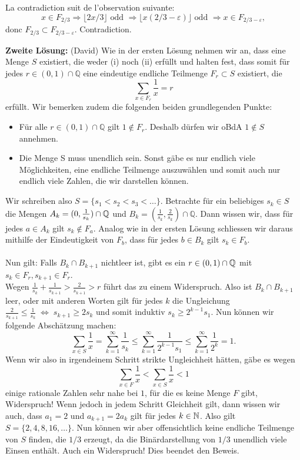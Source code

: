 La contradiction suit de l'observation suivante:
\[
x\in F_{2/3} \Rightarrow \lfloor 2x/3\rfloor \text{ odd } \Rightarrow \lfloor x(2/3-\varepsilon)\rfloor \text{ odd } \Rightarrow x\in F_{2/3-\varepsilon},
\]
donc $F_{2/3}\subset F_{2/3-\varepsilon}$. Contradiction.

\textbf{Zweite Lösung:} (David)
Wie in der ersten Lösung nehmen wir an, dass eine Menge $S$ existiert, die weder (i) noch (ii) erfüllt und halten fest, dass somit für jedes $r \in  (0,1) \cap \mathbb{Q}$ eine eindeutige endliche Teilmenge $F_r \subset S$ existiert, die 
\[\sum_{x\in F_r}\frac{1}{x}=r \]
erfüllt. Wir bemerken zudem die folgenden beiden grundlegenden Punkte:
\begin{itemize}
    \item Für alle $r \in (0,1) \cap \mathbb{Q}$ gilt $1 \notin F_r$. Deshalb dürfen wir oBdA $1 \notin S$ annehmen.
    \item Die Menge S muss unendlich sein. Sonst gäbe es nur endlich viele Möglichkeiten, eine endliche Teilmenge auszuwählen und somit auch nur endlich viele Zahlen, die wir darstellen können.
\end{itemize}
Wir schreiben also $S=\{s_1 < s_2 < s_3 < \dots \}$. Betrachte für ein beliebiges $s_k \in S$ die Mengen $A_k = (0,\frac{1}{s_k}) \cap \mathbb{Q}$ und $B_k = (\frac{1}{s_k}, \frac{2}{s_k}) \cap \mathbb{Q}$. Dann wissen wir, dass für jedes $a \in A_k$ gilt $s_k \notin F_a$. Analog wie in der ersten Lösung schliessen wir daraus mithilfe der Eindeutigkeit von $F_b$, dass für jedes $b \in B_k$ gilt $s_k \in F_b$. \\ \\ 
Nun gilt: Falls $B_k \cap B_{k+1}$ nichtleer ist, gibt es ein $r \in (0,1) \cap \mathbb{Q}$ mit $s_k \in F_r, s_{k+1} \in F_r$. \\ Wegen $\frac{1}{s_k} + \frac{1}{s_{k+1}} > \frac{2}{s_{k+1}} > r$ führt das zu einem Widerspruch. Also ist $B_k \cap B_{k+1}$ leer, oder mit anderen Worten gilt für jedes $k$ die Ungleichung $\frac{2}{s_{k+1}} \leq \frac{1}{s_k} \; \Longleftrightarrow \; s_{k+1} \geq 2s_k$ und somit induktiv $s_k \geq 2^{k-1}s_1$. Nun können wir folgende Abschätzung machen: 
\[
\sum_{x\in S}\frac{1}{x} = \sum_{k=1}^{\infty}\frac{1}{s_k} \leq \sum_{k=1}^{\infty} \frac{1}{2^{k-1}s_1} \leq \sum_{k=1}^{\infty}\frac{1}{2^k} = 1.
\]
Wenn wir also in irgendeinem Schritt strikte Ungleichheit hätten, gäbe es wegen \[
\sum_{x\in F}\frac{1}{x} < \sum_{x\in S}\frac{1}{x} < 1
\]
einige rationale Zahlen sehr nahe bei $1$, für die es keine Menge $F$ gibt, Widerspruch! \newline
Wenn jedoch in jedem Schritt Gleichheit gilt, dann wissen wir auch, dass $a_1 = 2$ und $a_{k+1} = 2a_k$ gilt für jedes $k \in \mathbb{N}$. Also gilt $S=\{2,4,8,16, \dots \}$. Nun können wir aber offensichtlich keine endliche Teilmenge von $S$ finden, die $1/3$ erzeugt, da die Binärdarstellung von $1/3$ unendlich viele Einsen enthält. Auch ein Widerspruch! Dies beendet den Beweis.

